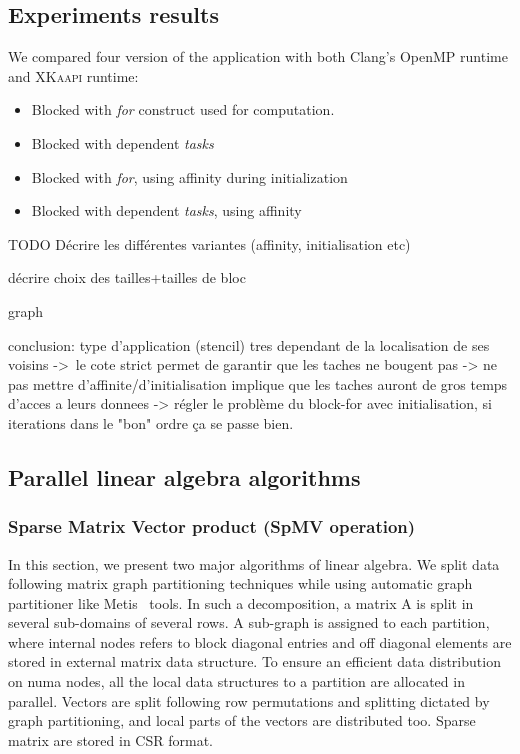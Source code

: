 \documentclass{Styles/llncs}
\newcommand{\kaapi}{\textsc{\mbox{XKaapi}}\xspace}
\begin{document}
\subsection{Experiments results}

We compared four version of the application with both Clang's OpenMP runtime
and \kaapi runtime:

\begin{itemize}
  \item Blocked with \emph{for} construct used for computation.
  \item Blocked with dependent \emph{tasks}
  \item Blocked with \emph{for}, using affinity during initialization
  \item Blocked with dependent \emph{tasks}, using affinity
\end{itemize}

TODO Décrire les différentes variantes
(affinity, initialisation etc)

décrire choix des tailles+tailles de bloc

graph

conclusion: type d'application (stencil) tres dependant de la localisation de ses voisins
-> le cote strict permet de garantir que les taches ne bougent pas
-> ne pas mettre d'affinite/d'initialisation implique que les taches auront de gros temps d'acces a leurs donnees
-> régler le problème du block-for avec initialisation, si iterations dans le "bon" ordre ça se passe bien.

\subsection{Parallel linear algebra algorithms}

\subsubsection{Sparse Matrix Vector product (SpMV operation)}

In this section, we present two major algorithms of linear algebra. We split data following matrix graph partitioning techniques \cite{Saad:2003:IMS:829576} while using automatic graph partitioner like Metis~\cite{metis} tools. In such a decomposition, a matrix A is split in several sub-domains of several rows. A sub-graph is assigned to each partition, where internal nodes refers to block diagonal entries and off diagonal elements are stored in external matrix data structure. To ensure an efficient data distribution on numa nodes, all the local data structures to a partition are allocated in parallel. Vectors are split following row permutations and splitting dictated by graph partitioning, and local parts of the vectors are distributed too. Sparse matrix are stored in CSR format.
\end{document}
